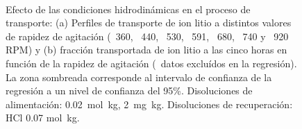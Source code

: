 \begin{figure}[H]
    \centering
    \\
    \caption[Efecto de las condiciones hidrodinámicas en el proceso de transporte.]{Efecto de las condiciones hidrodinámicas en el proceso de transporte: (a) Perfiles de transporte de ion litio a distintos valores de rapidez de agitación (\protect\squareblck\ 360, \protect\circleblck\ 440, \protect\triangleupblck\ 530, \protect\circlewht\ 591, \protect\squarewht\ 680, \protect\squarerttdwht\ 740 y \protect\triangleupwht\ 920 RPM) y (b) fracción transportada de ion litio a las cinco horas en función de la rapidez de agitación (\protect\triangleupblck\ datos excluídos en la regresión). La zona sombreada corresponde al intervalo de confianza de la regresión a un nivel de confianza del 95\%. Disoluciones de alimentación:  0.02~mol~kg\mnn,  2~mg~kg\mnn. Disoluciones de recuperación: HCl 0.07 mol~kg\mnn.}
    \label{fig:RPM1}
\end{figure}

